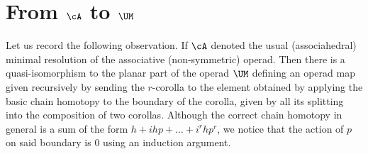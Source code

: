
\section{From $\cA$ to $\UM$}

Let us record the following observation.
If $\cA$ denoted the usual (associahedral) minimal resolution of the associative (non-symmetric) operad.
Then there is a quasi-isomorphism to the planar part of the operad $\UM$ defining an operad map given recursively by sending the $r$-corolla to the element obtained by applying the basic chain homotopy to the boundary of the corolla, given by all its splitting into the composition of two corollas.
Although the correct chain homotopy in general is a sum of the form $h + ihp + \dots + i^rhp^r$, we notice that the action of $p$ on said boundary is $0$ using an induction argument.

